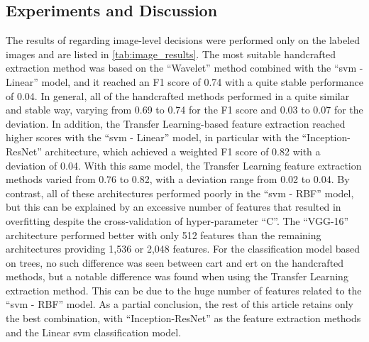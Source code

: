 \documentclass[journal,article,accept,moreauthors,pdftex, applsci]{Definitions/mdpi}
\begin{document}
\subsection{Experiments and Discussion}
The results of  regarding image-level decisions were performed only on the labeled images and are listed in \cref{tab:image_results}. The most suitable handcrafted extraction method was based on the “Wavelet” method combined with the “\ac{svm} - Linear” model, and it reached an F1 score of 0.74 with a quite stable performance of 0.04. In general, all of the handcrafted methods performed in a quite similar and stable way, varying from 0.69 to 0.74 for the F1 score and 0.03 to 0.07 for the deviation. In addition, the Transfer Learning-based feature extraction reached higher scores with the “\ac{svm} - Linear” model, in particular with the “Inception-ResNet” architecture, which achieved a weighted F1 score of 0.82 with a deviation of 0.04. With this same model, the Transfer Learning feature extraction methods varied from 0.76 to 0.82, with a deviation range from 0.02 to 0.04. By contrast, all of these architectures performed poorly in the “\ac{svm} - RBF” model, but this can be explained by an excessive number of features that resulted in overfitting despite the cross-validation of hyper-parameter “C”. The “VGG-16” architecture performed better with only 512 features than the remaining architectures providing 1,536 or 2,048 features. For the classification model based on trees, no such difference was seen between \ac{cart} and \ac{ert} on the handcrafted methods, but a notable difference was found when using the Transfer Learning extraction method. This can be due to the huge number of features related to the “\ac{svm} - RBF” model. As a partial conclusion, the rest of this article retains only the best combination, with “Inception-ResNet” as the feature extraction methods and the Linear \ac{svm} classification model.\par
\end{document}
